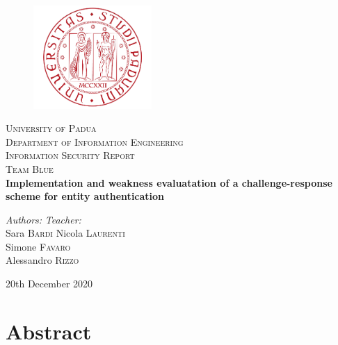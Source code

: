 \documentclass{report}
\begin{document}
\begin{titlepage}
\begin{center}
\vspace*{0.8cm}
\begin{figure}[H]
\centering
\includegraphics[width=0.4\textwidth]{logo_uni}
\end{figure}
\LARGE{\textsc{University of Padua}}\\
\vspace*{0.1cm}
\Large{\textsc{Department of Information Engineering}}\\
\vspace*{1.8cm}
\Large{\textsc{Information Security Report}}\\
\vspace*{0.1cm}
\Large{\textsc{Team Blue}}\\
\vspace*{0.8cm}
\huge{\textbf{Implementation and weakness evaluatation of a challenge-response scheme for entity authentication}}\\
\vspace*{1cm}
\end{center}
\large{\textit{Authors:}}
\hfill
\large{\textit{Teacher:}} \\
\large{Sara \textsc{Bardi}}
\hfill
\large{Nicola \textsc{Laurenti}}\\
\large{Simone \textsc{Favaro}}\\
\large{Alessandro \textsc{Rizzo}}\\

\begin{center}
\large{20th December 2020}\\
\end{center}
\end{titlepage}
\pagebreak




\setcounter{page}{1}




\begingroup
\let\clearpage\relax
\chapter*{Abstract}
\endgroup
\end{document}
